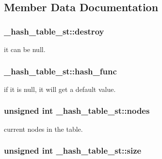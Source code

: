 \subsection{Member Data Documentation}
\hypertarget{struct__hash__table__st_aa6a42a3b0b637bb4d9a74f27e19c713f}{
\subsubsection[{destroy}]{ \-\_\-hash\-\_\-table\-\_\-st\-::destroy}}\label{struct__hash__table__st_aa6a42a3b0b637bb4d9a74f27e19c713f}
it can be null. \hypertarget{struct__hash__table__st_a92de25b041a2a7ee7207469b6a8634e4}{
\subsubsection[{hash\-\_\-func}]{ \-\_\-hash\-\_\-table\-\_\-st\-::hash\-\_\-func}}\label{struct__hash__table__st_a92de25b041a2a7ee7207469b6a8634e4}
if it is null, it will get a default value. \hypertarget{struct__hash__table__st_a5eadfd390197f22e359fd73c336795d3}{
\subsubsection[{nodes}]{\setlength{\rightskip}{0pt plus 5cm}unsigned int \-\_\-hash\-\_\-table\-\_\-st\-::nodes}}\label{struct__hash__table__st_a5eadfd390197f22e359fd73c336795d3}
current nodes in the table. \hypertarget{struct__hash__table__st_a043f42228ea0b4b5b5c5a27c0d407583}{
\subsubsection[{size}]{\setlength{\rightskip}{0pt plus 5cm}unsigned int \-\_\-hash\-\_\-table\-\_\-st\-::size}}\label{struct__hash__table__st_a043f42228ea0b4b5b5c5a27c0d407583}
